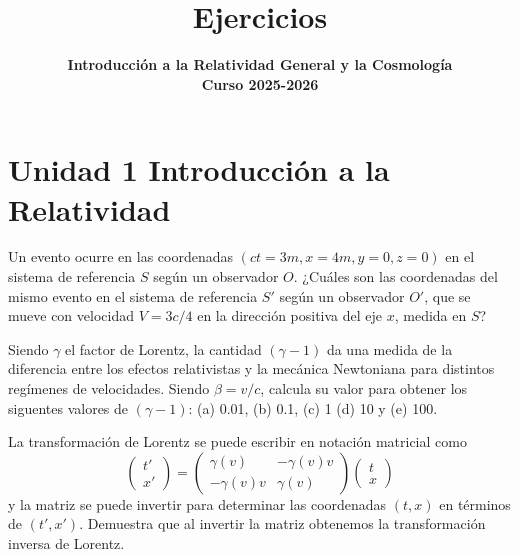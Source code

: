 \documentclass[12pt]{article}
\newenvironment{exercise}[2][Ejercicio]{\begin{trivlist} 
\item[\hskip \labelsep {\bfseries #1}\hskip \labelsep {\bfseries #2.}]}{\end{trivlist}}
\begin{document}
 
 
\title{\textbf{Ejercicios}}
\author{\textbf{Introducción a la Relatividad General y la Cosmología}\\
\textbf{Curso 2025-2026}}\date{} 
\maketitle

\section*{Unidad 1 Introducción a la Relatividad}

\begin{exercise}{1.1}
Un evento ocurre en las coordenadas $(ct=3m, x=4m, y=0, z=0)$ en el sistema de referencia 
$S$ según un observador $O$. ¿Cuáles son las coordenadas del mismo evento en el sistema de referencia 
$S'$ según un observador $O'$, que se mueve con velocidad $V=3c/4$ en la dirección positiva del eje 
$x$, medida en $S$?
\end{exercise}

\begin{exercise}{1.2} Siendo $\gamma$ el factor de Lorentz, la cantidad $(\gamma -1)$ da una medida de la diferencia entre los efectos relativistas y la mecánica Newtoniana para distintos regímenes de velocidades. Siendo $\beta=v/c$, calcula su valor para obtener los siguentes valores de $(\gamma-1)$: (a) 0.01, (b) 0.1, (c) 1 (d) 10 y (e) 100.
\end{exercise}

\begin{exercise}{1.3}  La transformación de Lorentz se puede escribir en notación matricial como
\[
\begin{pmatrix}
t' \\
x'
\end{pmatrix}
=
\begin{pmatrix}
\gamma(v) & -\gamma(v)v \\
-\gamma(v)v & \gamma(v)
\end{pmatrix}
\begin{pmatrix}
t \\
x
\end{pmatrix}
\]
y la matriz  se puede invertir para determinar las coordenadas $(t,x)$ en términos de $(t', x')$. Demuestra que al invertir la matriz obtenemos la transformación inversa de Lorentz.
\end{exercise}
\end{document}
